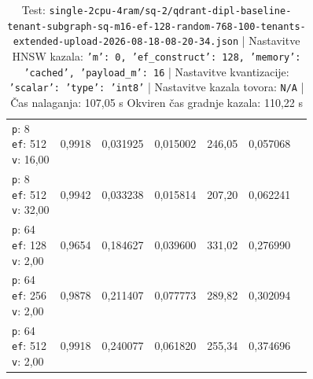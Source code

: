 \begin{table}[htbp]
\begin{tabularx}{\textwidth}{Xrrrrrr}
    \makecell{\texttt{p}: 8\\\texttt{ef}: 512\\\texttt{v}: 16,00} & 0,9918 & 0,031925 & 0,015002 & 246,05 & 0,057068 \\
    \makecell{\texttt{p}: 8\\\texttt{ef}: 512\\\texttt{v}: 32,00} & 0,9942 & 0,033238 & 0,015814 & 207,20 & 0,062241 \\
    \makecell{\texttt{p}: 64\\\texttt{ef}: 128\\\texttt{v}: 2,00} & 0,9654 & 0,184627 & 0,039600 & 331,02 & 0,276990 \\
    \makecell{\texttt{p}: 64\\\texttt{ef}: 256\\\texttt{v}: 2,00} & 0,9878 & 0,211407 & 0,077773 & 289,82 & 0,302094 \\
    \makecell{\texttt{p}: 64\\\texttt{ef}: 512\\\texttt{v}: 2,00} & 0,9918 & 0,240077 & 0,061820 & 255,34 & 0,374696 \\
    \bottomrule
  \end{tabularx}
\caption* {Test: \texttt{single-2cpu-4ram/sq-2/qdrant-dipl-baseline-tenant-subgraph-sq-m16-ef-128-random-768-100-tenants-extended-upload-2026-08-18-08-20-34.json} | Nastavitve HNSW kazala: \texttt{{'m': 0, 'ef\_construct': 128, 'memory': 'cached', 'payload\_m': 16}} | Nastavitve kvantizacije: \texttt{{'scalar': {'type': 'int8'}}} | Nastavitve kazala tovora: \texttt{N/A} | Čas nalaganja: 107,05 s Okviren čas gradnje kazala: 110,22 s}\end{table}


